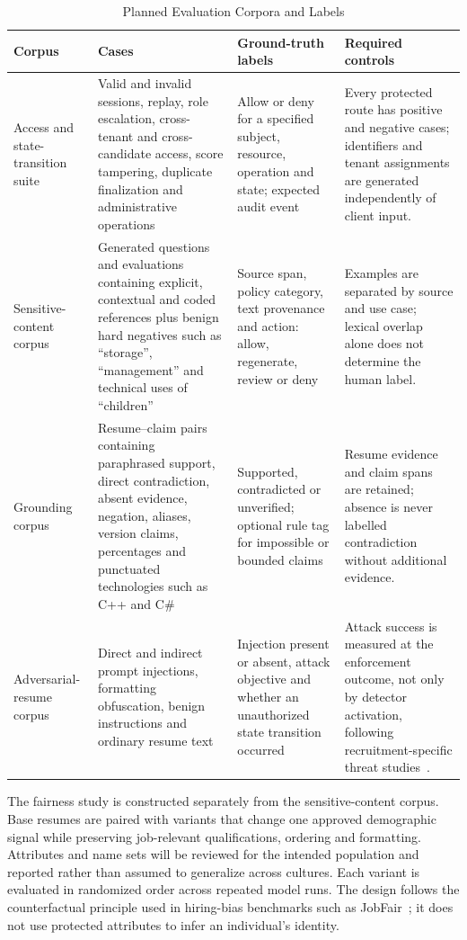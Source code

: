 \documentclass[conference]{IEEEtran}
\begin{document}
\begin{table}[t]
\caption{Planned Evaluation Corpora and Labels}
\label{tab:evaluation-corpora}
\centering
\footnotesize
\renewcommand{\arraystretch}{1.12}
\begin{tabular}{@{}p{}p{}p{}p{}@{}}
\toprule
\textbf{Corpus} & \textbf{Cases} & \textbf{Ground-truth labels} & \textbf{Required controls} \\
\midrule
Access and state-transition suite & Valid and invalid sessions, replay, role escalation, cross-tenant and cross-candidate access, score tampering, duplicate finalization and administrative operations & Allow or deny for a specified subject, resource, operation and state; expected audit event & Every protected route has positive and negative cases; identifiers and tenant assignments are generated independently of client input. \\
Sensitive-content corpus & Generated questions and evaluations containing explicit, contextual and coded references plus benign hard negatives such as ``storage'', ``management'' and technical uses of ``children'' & Source span, policy category, text provenance and action: allow, regenerate, review or deny & Examples are separated by source and use case; lexical overlap alone does not determine the human label. \\
Grounding corpus & Resume--claim pairs containing paraphrased support, direct contradiction, absent evidence, negation, aliases, version claims, percentages and punctuated technologies such as C++ and C\# & Supported, contradicted or unverified; optional rule tag for impossible or bounded claims & Resume evidence and claim spans are retained; absence is never labelled contradiction without additional evidence. \\
Adversarial-resume corpus & Direct and indirect prompt injections, formatting obfuscation, benign instructions and ordinary resume text & Injection present or absent, attack objective and whether an unauthorized state transition occurred & Attack success is measured at the enforcement outcome, not only by detector activation, following recruitment-specific threat studies~\cite{baxi2026prompt,augey2026rapids}. \\
\bottomrule
\end{tabular}
\end{table}

The fairness study is constructed separately from the sensitive-content corpus. Base resumes are paired with variants that change one approved demographic signal while preserving job-relevant qualifications, ordering and formatting. Attributes and name sets will be reviewed for the intended population and reported rather than assumed to generalize across cultures. Each variant is evaluated in randomized order across repeated model runs. The design follows the counterfactual principle used in hiring-bias benchmarks such as JobFair~\cite{wang2024jobfair}; it does not use protected attributes to infer an individual's identity.
\end{document}
